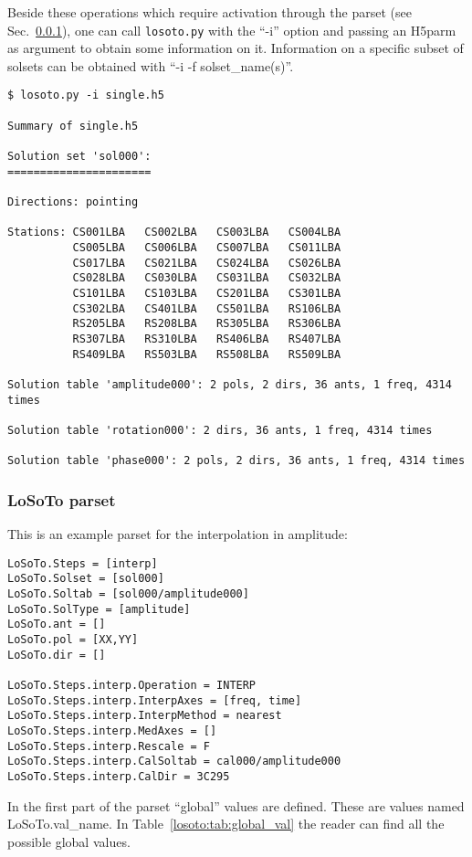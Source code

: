 \documentclass[structabstract]{article}
\begin{document}
Beside these operations which require activation through the \losoto{} parset (see Sec.~\ref{losoto:parset}), one can call \texttt{losoto.py} with the ``-i'' option and passing an H5parm as argument to obtain some information on it. Information on a specific subset of solsets can be obtained with ``-i -f solset\_name(s)''.

\begin{verbatim}
$ losoto.py -i single.h5

Summary of single.h5

Solution set 'sol000':
======================

Directions: pointing

Stations: CS001LBA   CS002LBA   CS003LBA   CS004LBA
          CS005LBA   CS006LBA   CS007LBA   CS011LBA
          CS017LBA   CS021LBA   CS024LBA   CS026LBA
          CS028LBA   CS030LBA   CS031LBA   CS032LBA
          CS101LBA   CS103LBA   CS201LBA   CS301LBA
          CS302LBA   CS401LBA   CS501LBA   RS106LBA
          RS205LBA   RS208LBA   RS305LBA   RS306LBA
          RS307LBA   RS310LBA   RS406LBA   RS407LBA
          RS409LBA   RS503LBA   RS508LBA   RS509LBA

Solution table 'amplitude000': 2 pols, 2 dirs, 36 ants, 1 freq, 4314 times

Solution table 'rotation000': 2 dirs, 36 ants, 1 freq, 4314 times

Solution table 'phase000': 2 pols, 2 dirs, 36 ants, 1 freq, 4314 times
\end{verbatim}

\subsubsection{LoSoTo parset}
\label{losoto:parset}

This is an example parset for the interpolation in amplitude:
\begin{verbatim}
LoSoTo.Steps = [interp]
LoSoTo.Solset = [sol000]
LoSoTo.Soltab = [sol000/amplitude000]
LoSoTo.SolType = [amplitude]
LoSoTo.ant = []
LoSoTo.pol = [XX,YY]
LoSoTo.dir = []

LoSoTo.Steps.interp.Operation = INTERP
LoSoTo.Steps.interp.InterpAxes = [freq, time]
LoSoTo.Steps.interp.InterpMethod = nearest
LoSoTo.Steps.interp.MedAxes = []
LoSoTo.Steps.interp.Rescale = F
LoSoTo.Steps.interp.CalSoltab = cal000/amplitude000
LoSoTo.Steps.interp.CalDir = 3C295
\end{verbatim}

In the first part of the parset ``global'' values are defined. These are values named LoSoTo.val\_name. In Table~\ref{losoto:tab:global_val} the reader can find all the possible global values.
\end{document}
